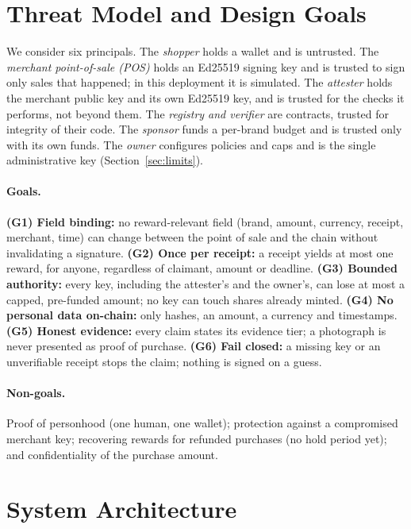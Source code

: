 \documentclass[10.5pt,letterpaper]{article}
\theoremstyle{definition}
\theoremstyle{remark}
\begin{document}
\section{Threat Model and Design Goals}\label{sec:threat}

We consider six principals. The \emph{shopper} holds a wallet and is untrusted. The \emph{merchant point-of-sale (POS)}
holds an Ed25519 signing key and is trusted to sign only sales that happened; in this deployment it is simulated.
The \emph{attester} holds the merchant public key and its own Ed25519 key, and is trusted for the checks it performs,
not beyond them. The \emph{registry and verifier} are contracts, trusted for integrity of their code. The
\emph{sponsor} funds a per-brand budget and is trusted only with its own funds. The \emph{owner} configures policies and
caps and is the single administrative key (Section~\ref{sec:limits}).

\paragraph{Goals.}
\textbf{(G1) Field binding:} no reward-relevant field (brand, amount, currency, receipt, merchant, time) can change
between the point of sale and the chain without invalidating a signature.
\textbf{(G2) Once per receipt:} a receipt yields at most one reward, for anyone, regardless of claimant, amount or deadline.
\textbf{(G3) Bounded authority:} every key, including the attester's and the owner's, can lose at most a capped,
pre-funded amount; no key can touch shares already minted.
\textbf{(G4) No personal data on-chain:} only hashes, an amount, a currency and timestamps.
\textbf{(G5) Honest evidence:} every claim states its evidence tier; a photograph is never presented as proof of purchase.
\textbf{(G6) Fail closed:} a missing key or an unverifiable receipt stops the claim; nothing is signed on a guess.

\paragraph{Non-goals.} Proof of personhood (one human, one wallet); protection against a compromised merchant key;
recovering rewards for refunded purchases (no hold period yet); and confidentiality of the purchase amount.

\section{System Architecture}\label{sec:arch}
\end{document}
